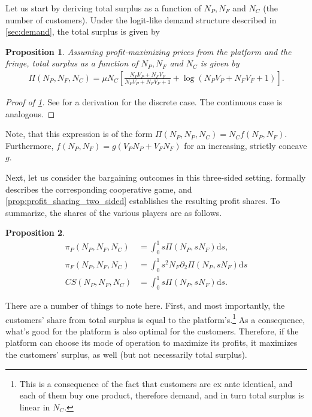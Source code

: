 \documentclass[a4paper]{article}
\newtheorem{proposition}{Proposition}
\newcommand{\ds}{\mathrm{d}s}
\begin{document}
Let us start by deriving total surplus as a function of $N_P, N_F$ and $N_C$ (the number of customers).
Under the logit-like demand structure described in \cref{sec:demand}, the total surplus is given by
\begin{proposition}
    \label{prop:profits_total_surplus}
    Assuming profit-maximizing prices from the platform and the fringe, total surplus as a function of $N_P, N_F$ and $N_C$ is given by
    \begin{align*}
        \Pi(N_P, N_F, N_C) = \mu N_C \left[ \frac{N_P V_P + N_F V_F}{N_P V_P + N_F V_F + 1} + \log(N_P V_P + N_F V_F + 1) \right].
    \end{align*}
\end{proposition}
\begin{proof}[Proof of \cref{prop:profits_total_surplus}]
    See \textcite{small1981applied} for a derivation for the discrete case.
    The continuous case is analogous.
\end{proof}
Note, that this expression is of the form $\Pi(N_P, N_P, N_C) = N_C f(N_P, N_F)$.
Furthermore, $f(N_P, N_F) = g(V_P N_P + V_F N_F)$ for an increasing, strictly concave $g$.

Next, let us consider the bargaining outcomes in this three-sided setting.
 formally describes the corresponding cooperative game, and \cref{prop:profit_sharing_two_sided} establishes the resulting profit shares.
To summarize, the shares of the various players are as follows.
\begin{proposition}
    \label{prop:three_way_shapley_value}
    \begin{align*}
        \pi_P(N_P, N_F, N_C) &= \int_0^1 s \Pi(N_P, s N_F) \ds, \\
        \pi_F(N_P, N_F, N_C) &= \int_0^1 s^2 N_F \partial_2 \Pi(N_P, s N_F) \ds \\
        CS(N_P, N_F, N_C) &= \int_0^1 s \Pi(N_P, s N_F) \ds.
    \end{align*}
\end{proposition}

There are a number of things to note here.
First, and most importantly, the customers' share from total surplus is equal to the platform's.\footnote{
    This is a consequence of the fact that customers are ex ante identical, and each of them buy one product, therefore demand, and in turn total surplus is linear in $N_C$.
}
As a consequence, what's good for the platform is also optimal for the customers.
Therefore, if the platform can choose its mode of operation to maximize its profits, it maximizes the customers' surplus, as well (but not necessarily total surplus).
\end{document}
